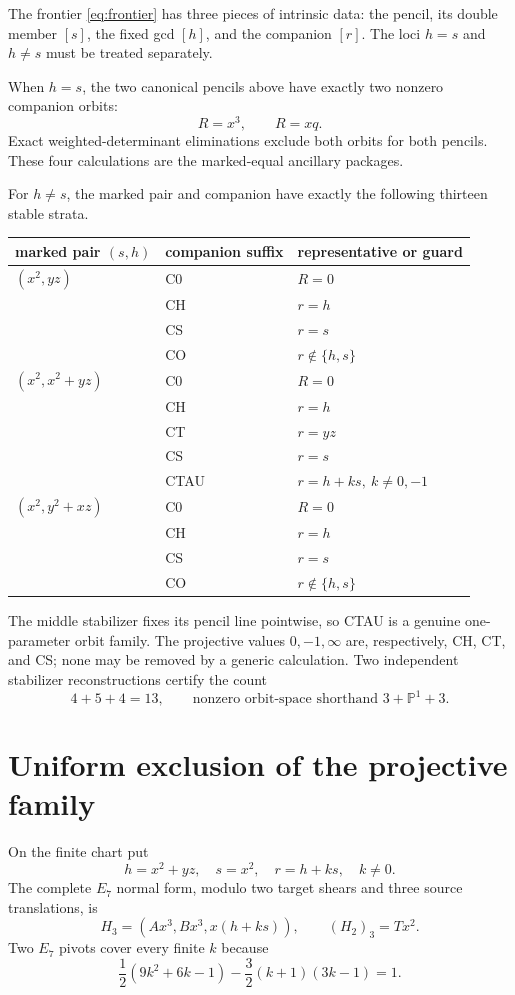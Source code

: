 \documentclass[11pt]{article}
\theoremstyle{remark}
\newcommand{\PP}{\mathbb P}
\begin{document}
The frontier \eqref{eq:frontier} has three pieces of intrinsic data:
the pencil, its double member $[s]$, the fixed gcd $[h]$, and the companion
$[r]$.  The loci $h=s$ and $h\ne s$ must be treated separately.

When $h=s$, the two canonical pencils above have exactly two nonzero
companion orbits:
\[
R=x^3,\qquad R=xq.
\]
Exact weighted-determinant eliminations exclude both orbits for both
pencils.  These four calculations are the marked-equal ancillary packages.

For $h\ne s$, the marked pair and companion have exactly the following
thirteen stable strata.

\begin{longtable}{lll}
\toprule
marked pair $(s,h)$ & companion suffix & representative or guard\\
\midrule
\endhead
$(x^2,yz)$ & C0 & $R=0$\\
            & CH & $r=h$\\
            & CS & $r=s$\\
            & CO & $r\notin\{h,s\}$\\[2pt]
$(x^2,x^2+yz)$ & C0 & $R=0$\\
            & CH & $r=h$\\
            & CT & $r=yz$\\
            & CS & $r=s$\\
            & CTAU & $r=h+ks,\ k\ne0,-1$\\[2pt]
$(x^2,y^2+xz)$ & C0 & $R=0$\\
            & CH & $r=h$\\
            & CS & $r=s$\\
            & CO & $r\notin\{h,s\}$\\
\bottomrule
\end{longtable}

The middle stabilizer fixes its pencil line pointwise, so CTAU is a genuine
one-parameter orbit family.  The projective values $0,-1,\infty$ are,
respectively, CH, CT, and CS; none may be removed by a generic calculation.
Two independent stabilizer reconstructions certify the count
\[
4+5+4=13,\qquad\text{nonzero orbit-space shorthand }3+\PP^1+3.
\]

\section{Uniform exclusion of the projective family}

On the finite chart put
\[
h=x^2+yz,\quad s=x^2,\quad r=h+ks,\quad k\ne0.
\]
The complete $E_7$ normal form, modulo two target shears and three source
translations, is
\[
H_3=(Ax^3,Bx^3,x(h+ks)),\qquad (H_2)_3=Tx^2.
\]
Two $E_7$ pivots cover every finite $k$ because
\[
\frac12(9k^2+6k-1)-\frac32(k+1)(3k-1)=1.
\]
\end{document}
